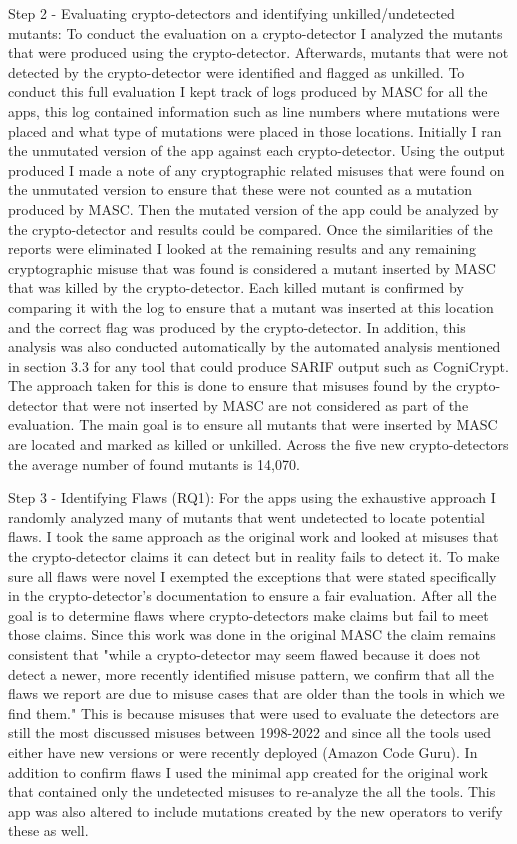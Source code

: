 Step 2 - Evaluating crypto-detectors and identifying unkilled/undetected mutants: To conduct the evaluation on a crypto-detector I analyzed the mutants that were produced using the crypto-detector. Afterwards, mutants that were not detected by the crypto-detector were identified and flagged as unkilled. To conduct this full evaluation I kept track of logs produced by MASC for all the apps, this log contained information such as line numbers where mutations were placed and what type of mutations were placed in those locations. Initially I ran the unmutated version of the app against each crypto-detector. Using the output produced I made a note of any cryptographic related misuses that were found on the unmutated version to ensure that these were not counted as a mutation produced by MASC. Then the mutated version of the app could be analyzed by the crypto-detector and results could be compared. Once the similarities of the reports were eliminated I looked at the remaining results and any remaining cryptographic misuse that was found is considered a mutant inserted by MASC that was killed by the crypto-detector. Each killed mutant is confirmed by comparing it with the log to ensure that a mutant was inserted at this location and the correct flag was produced by the crypto-detector. In addition, this analysis was also conducted automatically by the automated analysis mentioned in section 3.3 for any tool that could produce SARIF output such as CogniCrypt. The approach taken for this is done to ensure that misuses found by the crypto-detector that were not inserted by MASC are not considered as part of the evaluation. The main goal is to ensure all mutants that were inserted by MASC are located and marked as killed or unkilled. Across the five new crypto-detectors the average number of found mutants is 14,070.

Step 3 - Identifying Flaws (RQ1): For the apps using the exhaustive approach I randomly analyzed many of mutants that went undetected to locate potential flaws. I took the same approach as the original work and looked at misuses that the crypto-detector claims it can detect but in reality fails to detect it. To make sure all flaws were novel I exempted the exceptions that were stated specifically in the crypto-detector's documentation to ensure a fair evaluation. After all the goal is to determine flaws where crypto-detectors make claims but fail to meet those claims. Since this work was done in the original MASC the claim remains consistent that "while a crypto-detector may seem flawed because it does not detect a newer, more recently identified misuse pattern, we confirm that all the flaws we report are due to misuse cases that are older than the tools in which we find them." This is because misuses that were used to evaluate the detectors are still the most discussed misuses between 1998-2022 and since all the tools used either have new versions or were recently deployed (Amazon Code Guru). In addition to confirm flaws I used the minimal app created for the original work that contained only the undetected misuses to re-analyze the all the tools. This app was also altered to include mutations created by the new operators to verify these as well.

